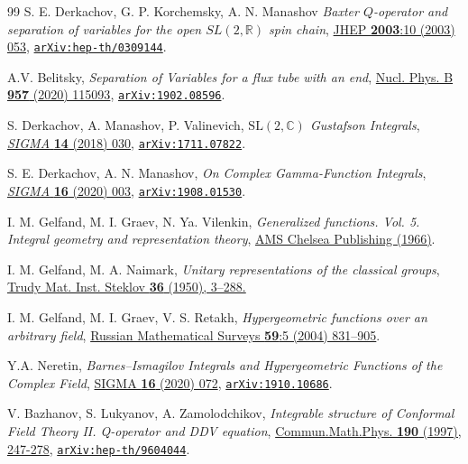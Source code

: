 \documentclass[a4paper,11pt]{article}
\numberwithin{equation}{section}
\begin{document}
\begin{thebibliography}{99}
 S. E. Derkachov, G. P. Korchemsky, A. N. Manashov
\textit{Baxter $Q$-operator and separation of variables for the open $SL(2,\mathbb{R})$ spin chain}, \href{https://doi.org/10.1088/1126-6708/2003/10/053}{JHEP \textbf{2003}:10 (2003) 053}, \href{https://arxiv.org/abs/hep-th/0309144}{\texttt{arXiv:hep-th/0309144}}.

A.V. Belitsky,
\textit{Separation of Variables for a flux tube with an end},
\href{https://doi.org/10.1016/j.nuclphysb.2020.115093}{Nucl. Phys. B \textbf{957} (2020) 115093},
\href{https://arxiv.org/abs/1902.08596}{\tt arXiv:1902.08596}.


 S. Derkachov, A. Manashov, P. Valinevich,
\textit{$\mathrm{SL}(2,\mathbb{C})$ Gustafson Integrals}, \href{https://doi.org/10.3842/SIGMA.2018.030}{\textit{SIGMA} \textbf{14} (2018) 030},
\href{https://doi.org/10.48550/arXiv.1711.07822}{\texttt{arXiv:1711.07822}}.

S. E. Derkachov, A. N. Manashov, \textit{On Complex Gamma-Function Integrals}, \href{https://doi.org/10.3842/SIGMA.2020.003}{\textit{SIGMA} \textbf{16} (2020) 003},
\href{https://arxiv.org/abs/1908.01530}{\texttt{arXiv:1908.01530}}.


 I. M. Gelfand, M. I. Graev, N. Ya. Vilenkin, \textit{Generalized functions. Vol. 5. Integral geometry and representation theory}, \href{http://dx.doi.org/10.1090/chel/381}{AMS Chelsea Publishing (1966)}.

I. M. Gelfand, M. A. Naimark,
{\em Unitary representations of the classical groups},
\href{https://www.mathnet.ru/php/archive.phtml?wshow=paper&jrnid=tm&paperid=1100&option_lang=eng}{Trudy Mat. Inst. Steklov {\bf 36} (1950), 3--288.}


I. M. Gelfand, M. I. Graev, V. S. Retakh, \textit{Hypergeometric functions over an arbitrary field}, \href{https://doi.org/10.1070/RM2004v059n05ABEH000771}{Russian Mathematical Surveys \textbf{59}:5 (2004) 831--905}.

 Y.A. Neretin, \textit{Barnes--Ismagilov Integrals and Hypergeometric Functions of the Complex Field}, \href{https://doi.org/10.3842/SIGMA.2020.072}{SIGMA \textbf{16} (2020) 072}, \href{https://arxiv.org/abs/1910.10686}{\texttt{arXiv:1910.10686}}.


V. Bazhanov, S. Lukyanov, A. Zamolodchikov,
\textit{Integrable structure of Conformal Field Theory II. Q-operator and DDV equation},
\href{https://link.springer.com/article/10.1007/s002200050240}{Commun.Math.Phys. \textbf{190} (1997), 247-278}, \href{https://arxiv.org/abs/hep-th/9604044}{\texttt{arXiv:hep-th/9604044}}.


\end{thebibliography}
\end{document}
